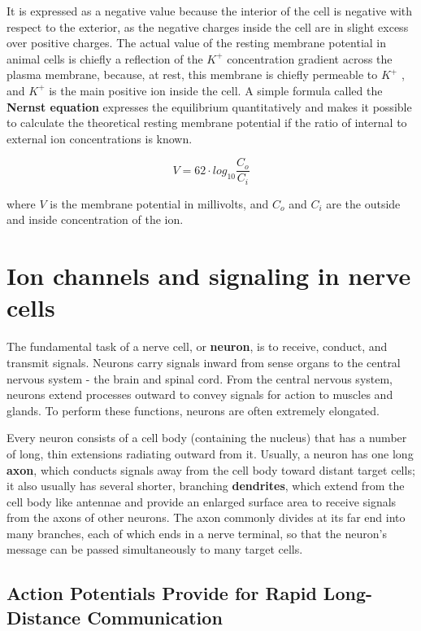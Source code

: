 It is expressed as a negative value because the interior of the cell is negative with respect to the
exterior, as the negative charges inside the cell are in slight excess over
positive charges. The actual value of the resting membrane potential in
animal cells is chiefly a reflection of the $K^{+}$ concentration gradient across
the plasma membrane, because, at rest, this membrane is chiefly permeable
to $K^{+}$ , and $K^{+}$ is the main positive ion inside the cell. A simple
formula called the \textbf{Nernst equation} expresses the equilibrium quantitatively
and makes it possible to calculate the theoretical
resting membrane potential if the ratio of internal to external ion concentrations is known.

\begin{equation}
V = 62 \cdot log_{10} \frac{C_{o}}{C_{i}}
\end{equation}

where $V$ is the membrane potential in millivolts, and $C_o$ and $C_i$ are the outside and inside concentration
of the ion.

\section{Ion channels and signaling in nerve cells}

The fundamental task of a nerve cell, or \textbf{neuron}, is to receive, conduct,
and transmit signals. Neurons carry signals inward from sense organs
to the central nervous system - the brain and spinal cord.
From the central nervous system, neurons extend processes outward to
convey signals for action to muscles and glands. To perform these functions,
neurons are often extremely elongated.

Every neuron consists of a cell body (containing the nucleus) that has a
number of long, thin extensions radiating outward from it. Usually, a neuron
has one long \textbf{axon}, which conducts signals away from the cell body
toward distant target cells; it also usually has several shorter, branching
\textbf{dendrites}, which extend from the cell body like antennae and provide an
enlarged surface area to receive signals from the axons of other neurons.
The axon commonly divides at its far end into many
branches, each of which ends in a nerve terminal, so that the neuron’s
message can be passed simultaneously to many target cells.

\subsection{Action Potentials Provide for Rapid Long-Distance Communication}

